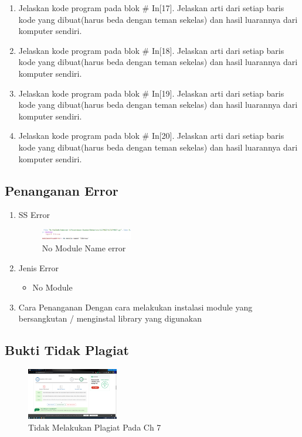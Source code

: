 \begin{enumerate}
\item Jelaskan kode program pada blok \# In[17]. Jelaskan arti dari setiap baris kode yang dibuat(harus beda dengan teman sekelas) dan hasil luarannya dari komputer sendiri.


\item Jelaskan kode program pada blok \# In[18]. Jelaskan arti dari setiap baris kode yang dibuat(harus beda dengan teman sekelas) dan hasil luarannya dari komputer sendiri.


\item Jelaskan kode program pada blok \# In[19]. Jelaskan arti dari setiap baris kode yang dibuat(harus beda dengan teman sekelas) dan hasil luarannya dari komputer sendiri.


\item Jelaskan kode program pada blok \# In[20]. Jelaskan arti dari setiap baris kode yang dibuat(harus beda dengan teman sekelas) dan hasil luarannya dari komputer sendiri.

\end{enumerate}
\subsection{Penanganan Error}
\begin{enumerate}
	\item SS Error
	\begin{figure}[H]
		\includegraphics[width=4cm]{figures/1174027/error/7_no_module.png}
		\centering
		\caption{No Module Name error}
	\end{figure}
	\item Jenis Error
	\begin{itemize}
		\item No Module
	\end{itemize}
	\item Cara Penanganan
	\hfill\break
	Dengan cara melakukan instalasi module yang bersangkutan / menginstal library yang digunakan
\end{enumerate}
\subsection{Bukti Tidak Plagiat}
\begin{figure}[H]
    \includegraphics[width=4cm]{figures/1174027/bukti/7.png}
    \centering
    \caption{Tidak Melakukan Plagiat Pada Ch 7}
\end{figure}